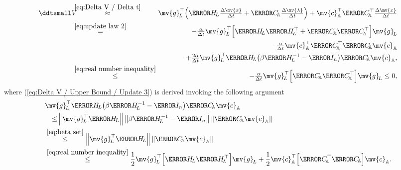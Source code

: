 \documentclass[journal]{IEEEtranTIE}
\begin{document}
\begin{eqnarray}
\ddtsmall V & \!\!\!\! \stackrel{\eqref{eq:Delta V / Delta t}}{\approx} \!\!\!\!  & \mv{g}_{\!L}^\top \Big( \mm{H}_{\! L}\tfrac{\Delta \mv{x}}{\Delta t}  + \mm{C}_{\!\mathbb{A}} \tfrac{\Delta \mv{\lambda}}{\Delta t}  \Big) + \mv{c}_{\mathbb{A}}^\top \mm{C}_{\!\mathbb{A}}^\top \tfrac{\Delta \mv{x}}{\Delta t} \notag \\
 & \!\!\!\! \stackrel{\eqref{eq:update law 2}}{=} \!\!\!\! & -\tfrac{\alpha}{\Delta t} \mv{g}_{\!L}^\top \Big[ \mm{H}_{\! L} \mm{H}_{\! L}^\top + \mm{C}_{\!\mathbb{A}} \mm{C}_{\!\mathbb{A}}^\top \Big] \mv{g}_{\!L} \notag \\
 & &  -\tfrac{\alpha}{\Delta t}  \mv{c}_{\mathbb{A}}^\top \mm{C}_{\!\mathbb{A}}^\top  \mm{C}_{\!\mathbb{A}} \mv{c}_{\mathbb{A}} \notag \\
 & & + \tfrac{2\alpha}{\Delta t} \mv{g}_{\!L}^\top \mm{H}_{\! L} \big(\beta \mm{H}_{\! L}^{-1} - \mm{I}_n \big) \mm{C}_{\!\mathbb{A}} \mv{c}_{\mathbb{A}} \label{eq:Delta V / Update 3}, \\
 & \!\!\!\! \stackrel{\eqref{eq:real number inequality}}{\le} \!\!\!\! & -\tfrac{\alpha}{\Delta t} \mv{g}_{\!L}^\top \Big[\mm{C}_{\!\mathbb{A}} \mm{C}_{\!\mathbb{A}}^\top \Big] \mv{g}_{\!L} \le 0,\label{eq:Delta V / Upper Bound / Update 3}
\end{eqnarray}
where (\ref{eq:Delta V / Upper Bound / Update 3}) is derived invoking the following argument 
\begin{align*}
& \mv{g}_{\!L}^\top \mm{H}_{\! L} \big(\beta \mm{H}_{\! L}^{-1} - \mm{I}_n \big) \mm{C}_{\!\mathbb{A}} \mv{c}_{\mathbb{A}} \\
& \quad  {\le} \left\| {{\mv{g}_{\! L}^\top}\mm{H}_{\! L}} \right\| \left \| \beta \mm{H}_{\! L}^{-1} - \mm{I}_n \right\| \left \| {{\mm{C}_{\!\mathbb{A}}}\mv{c}_{\mathbb{A}}} \right\| \notag \\
& \stackrel{\eqref{eq:beta set}}{\le} \left\| {{\mv{g}_{\! L}^\top}\mm{H}_{\! L}} \right\| \left \| {{\mm{C}_{\!\mathbb{A}}}\mv{c}_{\mathbb{A}}} \right\| \notag \\
& \stackrel{\eqref{eq:real number inequality}}{\le} \frac{1}{2}{\mv{g}_{\! L}^\top}\Big[ \mm{H}_{\! L}{\mm{H}_{\! L}^\top} \Big]\mv{g}_{\! L} + \frac{1}{2}\mv{c}_{\mathbb{A}}^\top\Big[ \mm{C}_{\!\mathbb{A}}^\top{\mm{C}_{\!\mathbb{A}}} \Big]\mv{c}_{\mathbb{A}}\label{eq:inequality for proof}. 
\end{align*}
\end{document}
